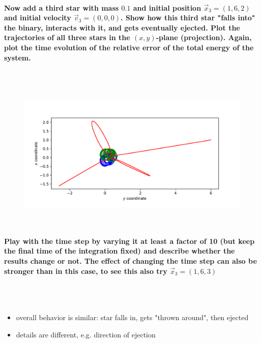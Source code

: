     \paragraph{Now add a third star with mass $0.1$ and initial position 
        $\vec x_3=(1,6,2)$ and initial velocity $\vec v_3=(0,0,0)$. Show how 
        this third star "falls into" the binary, interacts with it, and gets 
        eventually ejected. Plot the trajectories of all three stars in the 
        $(x,y)$-plane (projection). Again, plot the time evolution of the 
        relative error of the total energy of the system.
    } \ \\
        \\
        \begin{figure}[h!]
            \centering
            \includegraphics[width=\textwidth]{./figures/task2_3body.pdf}
            \caption{}
        \end{figure} \ \\ 
    
    \paragraph{Play with the time step by varying it at least a factor of 10 
        (but keep the final time of the integration fixed) and describe whether 
        the results change or not. The effect of changing the time step can 
        also be stronger than in this case, to see this also try 
        $\vec x_3=(1,6,3)$
    } \ \\
        \\
        \begin{itemize}
            \item overall behavior is similar: star falls in, gets 
                "thrown around", then ejected
            \item details are different, e.g. direction of ejection
        \end{itemize}

